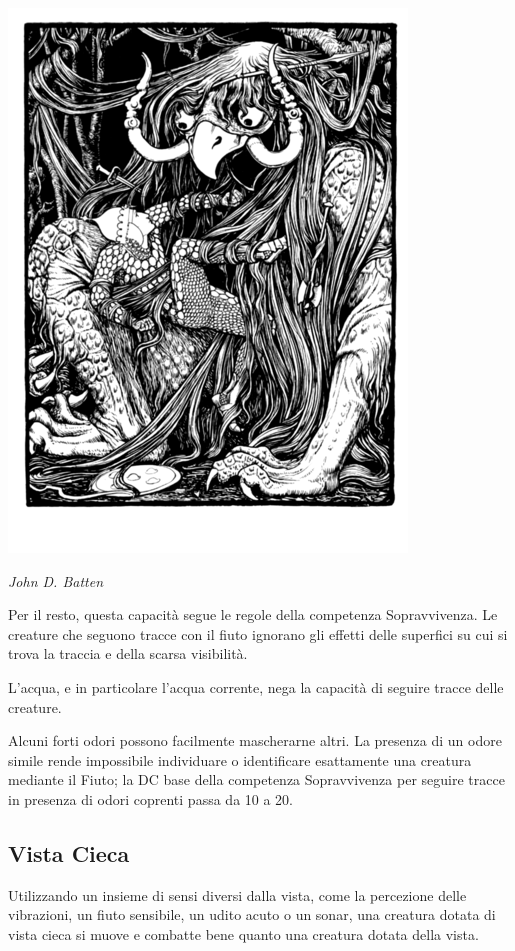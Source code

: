 \begin{multicols}{2}
\begin{center}
\includegraphics[width=0.7\linewidth]{immagini/mostro.png}

\emph{John D. Batten}
\end{center}

Per il resto, questa capacità segue le regole della competenza Sopravvivenza. Le creature che seguono tracce con il fiuto ignorano gli effetti delle superfici su cui si trova la traccia e della scarsa visibilità.

L'acqua, e in particolare l'acqua corrente, nega la capacità di seguire tracce delle creature.

Alcuni forti odori possono facilmente mascherarne altri. La presenza di un odore simile rende impossibile individuare o identificare esattamente una creatura mediante il Fiuto; la DC base della competenza Sopravvivenza per seguire tracce in presenza di odori coprenti passa da 10 a 20.

\subsection{Vista Cieca}\label{vistacieca}

Utilizzando un insieme di sensi diversi dalla vista, come la percezione delle vibrazioni, un fiuto sensibile, un udito acuto o un sonar, una creatura dotata di vista cieca si muove e combatte bene quanto una creatura dotata della vista.


\end{multicols}
